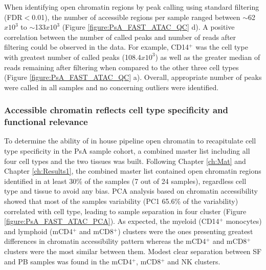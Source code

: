 When identifying open chromatin regions by peak calling using standard filtering (FDR$<$0.01), the number of accessible regions per sample ranged between $\sim$62$x10^3$ to $\sim$133$x10^3$ (Figure \ref{figure:PsA_FAST_ATAC_QC} d). A positive correlation between the number of called peaks and number of reads after filtering could be observed in the data. For example, CD14$^+$ was the cell type with greatest number of called peaks (108.4$x10^3$) as well as the greater median of reads remaining after filtering when compared to the other three cell types (Figure \ref{figure:PsA_FAST_ATAC_QC} a). Overall, appropriate number of peaks were called in all samples and no concerning outliers were identified.



\subsubsection{Accessible chromatin reflects cell type specificity and functional relevance}
To determine the ability of in house pipeline open chromatin to recapitulate cell type specificity in the PsA sample cohort, a combined master list including all four cell types and the two tissues was built. Following Chapter \ref{ch:Mat} and Chapter \ref{ch:Results1}, the combined master list contained open chromatin regions identified in at least 30\% of the samples (7 out of 24 samples), regardless cell type and tissue to avoid any bias. PCA analysis based on chromatin accessibility showed that most of the samples variability (PC1 65.6\% of the variability) correlated with cell type, leading to sample separation in four cluster (Figure \ref{figure:PsA_FAST_ATAC_PCA}). As expected, the myeloid (CD14$^+$ monocytes) and lymphoid (mCD4$^+$ and mCD8$^+$) clusters were the ones presenting greatest differences in chromatin accessibility pattern whereas the mCD4$^+$ and mCD8$^+$ clusters were the most similar between them. Modest clear separation between SF and PB samples was found in the mCD4$^+$, mCD8$^+$ and NK clusters.

